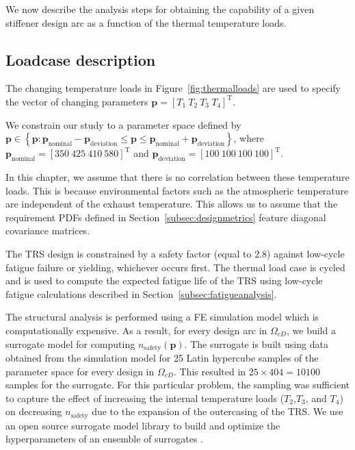 We now describe the analysis steps for obtaining the capability of a given stiffener design arc as a function of the thermal temperature loads.

\subsection{Loadcase description} \label{subsec:loadcase}

The changing temperature loads in Figure~\ref{fig:thermalloads} are used to specify the vector of changing parameters $\mathbf{p} = \left[ T_1 ~ T_2 ~ T_3 ~ T_4 \right]^{\mathrm{T}}$.

We constrain our study to a parameter space defined by $\mathbf{p} \in \left\{ \mathbf{p}: \mathbf{p}_{\textrm{nominal}} -\mathbf{p}_{\textrm{deviation}} \leq \mathbf{p} \leq \mathbf{p}_{\textrm{nominal}} + \mathbf{p}_{\textrm{deviation}} \right\}$, where $\mathbf{p}_{\textrm{nominal}} = \left[ 350 ~ 425 ~ 410 ~ 580\right]^{\mathrm{T}}$ and $\mathbf{p}_{\textrm{deviation}} = \left[100 ~ 100 ~ 100 ~ 100\right]^{\mathrm{T}}$. 

In this chapter, we assume that there is no correlation between these temperature loads. This is because environmental factors such as the atmospheric temperature are independent of the exhaust temperature. This allows us to assume that the requirement \acp{PDF} defined in Section~\ref{subsec:designmetrics} feature diagonal covariance matrices.

The \ac{TRS} design is constrained by a safety factor (equal to 2.8) against low-cycle fatigue failure or yielding, whichever occurs first. The thermal load case is cycled and is used to compute the expected fatigue life of the \ac{TRS} using low-cycle fatigue calculations described in Section~\ref{subsec:fatigueanalysis}. 

The structural analysis is performed using a \ac{FE} simulation model which is computationally expensive. As a result, for every design arc in $\Omega_{cD}$, we build a surrogate model for computing $n_{\textrm{safety}}(\mathbf{p})$. The surrogate is built using data obtained from the simulation model for 25 Latin hypercube samples of the parameter space for every design in $\Omega_{cD}$. This resulted in $25\times404=10100$ samples for the surrogate. For this particular problem, the sampling was sufficient to capture the effect of increasing the internal temperature loads ($T_2$,$T_3$, and $T_4$) on decreasing $n_{\textrm{safety}}$ due to the expansion of the outercasing of the \ac{TRS}. We use an open source surrogate model library to build and optimize the hyperparameters of an ensemble of surrogates \cite{Talgorn2018}. 

